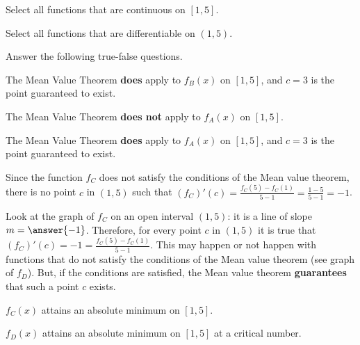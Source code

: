\documentclass{ximera}
\begin{document}
\begin{exercise}
Select all functions that are continuous on $[1,5]$.
\begin{selectAll}
\end{selectAll}
\begin{exercise}
Select all functions that are differentiable on $(1,5)$.
\begin{selectAll}
\end{selectAll}
\begin{exercise}
Answer the following true-false questions.

The Mean Value Theorem \textbf{does} apply to $f_B(x)$ on $[1,5]$, and $c=3$ is the point guaranteed to exist.
\begin{multipleChoice}
\end{multipleChoice}

The Mean Value Theorem \textbf{does not} apply to $f_A(x)$ on $[1,5]$. 
\begin{multipleChoice}
\end{multipleChoice}

The Mean Value Theorem \textbf{does} apply to $f_A(x)$ on $[1,5]$, and $c=3$ is the point guaranteed to exist.
\begin{multipleChoice}
\end{multipleChoice}

Since the function $f_C$ does not satisfy the conditions of the Mean value theorem, there is no point $c$ in $(1,5)$ such that $(f_C)'(c)=\frac{f_C(5)-f_C(1)}{5-1}=\frac{1-5}{5-1}=-1$.
\begin{hint}
Look at the graph of $f_C$ on an open interval $(1,5)$: it is a line of slope $m=\answer{-1}$. Therefore, for every point $c$ in $(1,5)$ it is true that  $(f_C)'(c)=-1=\frac{f_C(5)-f_C(1)}{5-1}$. This may happen or not happen with functions that do not satisfy the conditions of the Mean value theorem (see graph of $f_D$). But, if the conditions are satisfied, the Mean value theorem \textbf{guarantees} that such a point $c$ exists.
\end{hint}
\begin{multipleChoice}
\end{multipleChoice}
$f_C(x)$ attains an absolute minimum on $[1,5]$.
\begin{multipleChoice}
\end{multipleChoice}

$f_D(x)$ attains an absolute minimum on $[1,5]$ at a critical number.
\begin{multipleChoice}
\end{multipleChoice}
\end{exercise}
\end{exercise}
\end{exercise}
\end{document}
